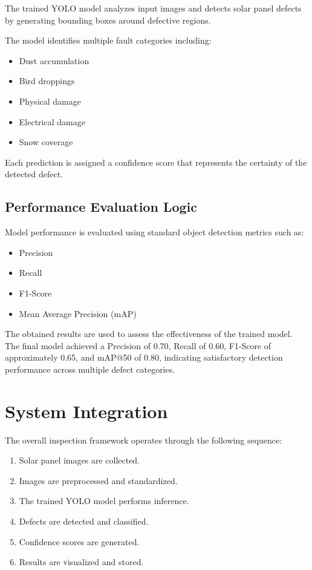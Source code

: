 The trained YOLO model analyzes input images and detects solar panel defects by generating bounding boxes around defective regions.

The model identifies multiple fault categories including:

\begin{itemize}
\item Dust accumulation
\item Bird droppings
\item Physical damage
\item Electrical damage
\item Snow coverage
\end{itemize}

Each prediction is assigned a confidence score that represents the certainty of the detected defect.

\subsection{Performance Evaluation Logic}

Model performance is evaluated using standard object detection metrics such as:

\begin{itemize}
\item Precision
\item Recall
\item F1-Score
\item Mean Average Precision (mAP)
\end{itemize}

The obtained results are used to assess the effectiveness of the trained model. The final model achieved a Precision of 0.70, Recall of 0.60, F1-Score of approximately 0.65, and mAP@50 of 0.80, indicating satisfactory detection performance across multiple defect categories.

\section{System Integration}

The overall inspection framework operates through the following sequence:

\begin{enumerate}
\item Solar panel images are collected.
\item Images are preprocessed and standardized.
\item The trained YOLO model performs inference.
\item Defects are detected and classified.
\item Confidence scores are generated.
\item Results are visualized and stored.
\end{enumerate}

